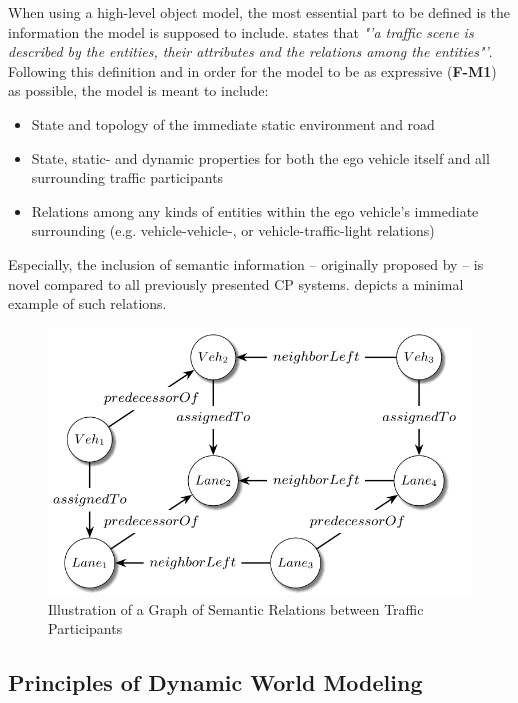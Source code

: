 When using a high-level object model, the most essential part to be defined is the information the model is supposed to include. \cite{Petrich2018} states that \textit{"'a traffic scene is described by the entities, their attributes and the relations among the entities"'}. Following this definition and in order for the model to be as expressive (\textbf{F-M1}) as possible, the model is meant to include:

\begin{itemize}
	\item State and topology of the immediate static environment and road
	\item State, static- and dynamic properties for both the ego vehicle itself and all surrounding traffic participants
	\item Relations among any kinds of entities within the ego vehicle's immediate surrounding (e.g. vehicle-vehicle-, or vehicle-traffic-light relations)
\end{itemize}

Especially, the inclusion of semantic information – originally proposed by \cite{Kohlhaas2014} – is novel compared to all previously presented CP systems.  depicts a minimal example of such relations. 

\begin{figure}
	\centering
	\includegraphics[width=0.5\linewidth]{98_images/relations}
	\caption[Semantic Relations between Traffic Participants]{Illustration of a Graph of Semantic Relations between Traffic Participants \cite{Petrich2018}}
	\label{fig:relations}
\end{figure}

\subsection{Principles of Dynamic World Modeling}
\label{subsec:concept_design:principle_of_dynamic_world_modeling}

